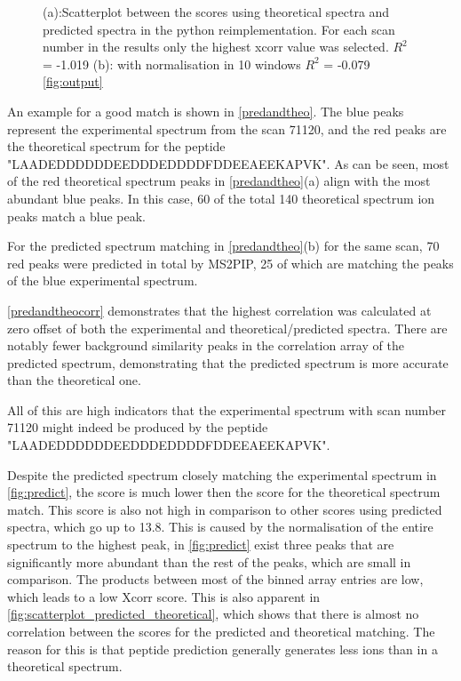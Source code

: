 \documentclass[11pt]{article}
\begin{document}
\begin{figure}
\begin{subfigure}[b]{1\textwidth}
   \caption{}
   \label{fig:scatterplot_windows}
\end{subfigure}
\caption{(a):Scatterplot between the scores using theoretical spectra and predicted spectra in the python reimplementation. For each scan number in the results only the highest xcorr value was selected. \(R^2\) = -1.019 (b): with normalisation in 10 windows \(R^2\) = -0.079 \cref{fig:output}}
\label{scatterplot_python}
\end{figure}
An example for a good match is shown in \cref{predandtheo}. The blue peaks represent the experimental spectrum from the scan 71120, and the red peaks are the theoretical spectrum for the peptide "LAADEDDDDDDEEDDDEDDDDFDDEEAEEKAPVK". As can be seen, most of the red theoretical spectrum peaks in \cref{predandtheo}(a) align with the most abundant blue peaks. In this case, 60 of the total 140 theoretical spectrum ion peaks match a blue peak. 

For the predicted spectrum matching in \cref{predandtheo}(b) for the same scan, 70 red peaks were predicted in total by MS2PIP, 25 of which are matching the peaks of the blue experimental spectrum.

\cref{predandtheocorr} demonstrates that the highest correlation was calculated at zero offset of both the experimental and theoretical/predicted spectra. There are notably fewer background similarity peaks in the correlation array of the predicted spectrum, demonstrating that the predicted spectrum is more accurate than the theoretical one.

All of this are high indicators that the experimental spectrum with scan number 71120 might indeed be produced by the peptide "LAADEDDDDDDEEDDDEDDDDFDDEEAEEKAPVK".

Despite the predicted spectrum closely matching the experimental spectrum in \cref{fig:predict}, the score is much lower then the score for the theoretical spectrum match. This score is also not high in comparison to other scores using predicted spectra, which go up to 13.8. This is caused by the normalisation of the entire spectrum to the highest peak, in \cref{fig:predict} exist three peaks that are significantly more abundant than the rest of the peaks, which are small in comparison. The products between most of the binned array entries are low, which leads to a low Xcorr score. This is also apparent in \cref{fig:scatterplot_predicted_theoretical}, which shows that there is almost no correlation between the scores for the predicted and theoretical matching. The reason for this is that peptide prediction generally generates less ions than in a theoretical spectrum.
\end{document}
